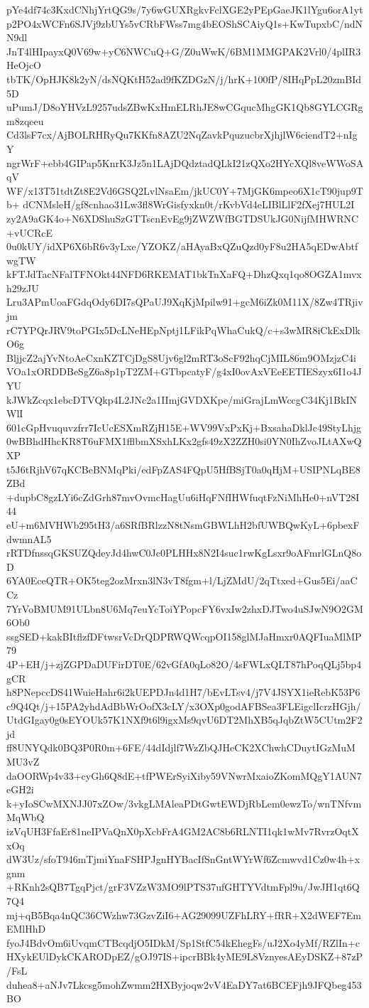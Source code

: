 pYe4df74c3KxdCNhjYrtQG9s/7y6wGUXRgkvFclXGE2yPEpGaeJK1lYgu6orA1yt
p2PO4xWCFn6SJVj9zbUYs5vCRbFWss7mg4bEOShSCAiyQ1s+KwTupxbC/ndNN9dl
JnT4lHIpayxQ0V69w+yC6NWCuQ+G/Z0uWwK/6BM1MMGPAK2Vrl0/4plIR3HeOjcO
tbTK/OpHJK8k2yN/dsNQKtH52ad9fKZDGzN/j/hrK+100fP/8IHqPpL20zmBId5D
uPumJ/D8oYHVzL9257udsZBwKxHmELRhJE8wCGqucMhgGK1Qb8GYLCGRgm8zqeeu
Cd3lsF7cx/AjBOLRHRyQu7KKfn8AZU2NqZavkPquzucbrXjhjlW6ciendT2+nIgY
ngrWrF+ebb4GIPap5KnrK3Jz5n1LAjDQdztadQLkI21zQXo2HYcXQl8veWWoSAqV
WF/x13T51tdtZt8E2Vd6GSQ2LvlNsaEm/jkUC0Y+7MjGK6mpeo6X1cT90jup9Tb+
dCNMsleH/gf8cnhao31Lw3fl8WrGisfyxkn0t/rKvbVd4eLIBlLlF2fXej7HUL2I
zy2A9aGK4o+N6XDShuSzGTTscnEvEg9jZWZWfBGTDSUkJG0NijfMHWRNC+vUCRcE
0u0kUY/idXP6X6bR6v3yLxe/YZOKZ/aHAyaBxQZuQzd0yF8u2HA5qEDwAbtfwgTW
kFTJdTacNFalTFNOkt44NFD6RKEMAT1bkTnXaFQ+DhzQxq1qo8OGZA1mvxh29zJU
Lru3APmUoaFGdqOdy6DI7sQPaUJ9XqKjMpilw91+gcM6iZk0M11X/8Zw4TRjivjm
rC7YPQrJRV9toPGIx5DcLNeHEpNptj1LFikPqWhaCukQ/c+s3wMR8iCkExDlkO6g
BljjcZ2ajYvNtoAeCxnKZTCjDgS8Ujv6gl2mRT3oScF92hqCjMIL86m9OMzjzC4i
VOa1xORDDBeSgZ6a8p1pT2ZM+GTbpcatyF/g4xI0ovAxVEeEETIESzyx6I1o4JYU
kJWkZcqx1ebcDTVQkp4L2JNc2a1IImjGVDXKpe/miGrajLmWccgC34Kj1BkINWlI
601cGpHvuquvzfrr7IcUcESXmRZjH15E+WV99VxPxKj+BxsahaDklJc49StyLhjg
0wBBhdHhcKR8T6uFMX1fflbmXSxhLKx2gfs49zX2ZZH0si0YN0IhZvoJLtAXwQXP
t5J6tRjhV67qKCBeBNMqPki/edFpZAS4FQpU5HfBSjT0a0qHjM+USIPNLqBE8ZBd
+dupbC8gzLYi6cZdGrh87mvOvmcHagUu6iHqFNfIHWfuqtFzNiMhHe0+nVT28I44
eU+m6MVHWb295tH3/a6SRfBRlzzN8tNsmGBWLhH2bfUWBQwKyL+6pbexFdwmnAL5
rRTDfnssqGKSUZQdeyJd4hwC0Jc0PLHHx8N2I4suc1rwKgLsxr9oAFmrlGLnQ8oD
6YA0EceQTR+OK5teg2ozMrxn3lN3vT8fgm+l/LjZMdU/2qTtxed+Gus5Ei/aaCCz
7YrVoBMUM91ULbn8U6Mq7euYcToiYPopcFY6vxIw2zhxDJTwo4uSJwN9O2GM6Ob0
ssgSED+kakBItflzfDFtwsrVcDrQDPRWQWcqpOI158glMJaHmxr0AQFIuaMlMP79
4P+EH/j+zjZGPDaDUFirDT0E/62vGfA0qLo82O/4sFWLxQLT87hPoqQLj5bp4gCR
h8PNepccDS41WuieHahr6i2kUEPDJn4d1H7/bEvLTsv4/j7V4JSYX1ieRebK53P6
c9Q4Qt/j+15PA2yhdAdBbWrOofX3cLY/x3OXp0godAFBSea3FLEigclIcrzHGjh/
UtdGIgay0g0sEYOUk57K1NXf9t6l9igxMs9qvU6DT2MhXB5qJqbZtW5CUtm2F2jd
ff8UNYQdk0BQ3P0R0m+6FE/44dIdjlf7WzZbQJHeCK2XChwhCDuytIGzMuMMU3vZ
daOORWp4v33+cyGh6Q8dE+tfPWErSyiXiby59VNwrMxaioZKomMQgY1AUN7eGH2i
k+yIoSCwMXNJJ07xZOw/3vkgLMAleaPDtGwtEWDjRbLem0ewzTo/wnTNfvmMqWbQ
izVqUH3FfaEr81neIPVaQnX0pXcbFrA4GM2AC8b6RLNTI1qk1wMv7RvrzOqtXxOq
dW3Uz/sfoT946mTjmiYnaFSHPJgnHYBacIfSnGntWYrWf6Zcmwvd1Cz0w4h+xgnm
+RKnh2sQB7TgqPjct/grF3VZzW3MO9lPTS37ufGHTYVdtmFpl9u/JwJH1qt6Q7Q4
mj+qB5Bqa4nQC36CWzhw73GzvZiI6+AG29099UZFhLRY+fRR+X2dWEF7EmEMlHhD
fyoJ4BdvOm6iUvqmCTBcqdjO5IDkM/Sp1StfC54kEhegFs/uJ2Xo4yMf/RZlIn+c
HXykEUlDykCKARODpEZ/gOJ97IS+ipcrBBk4yME9L8VznyesAEyDSKZ+87zP/FsL
duhea8+aNJv7Lkcsg5mohZwmm2HXByjoqw2vV4EaDY7at6BCEFjh9JFQbeg453BO
